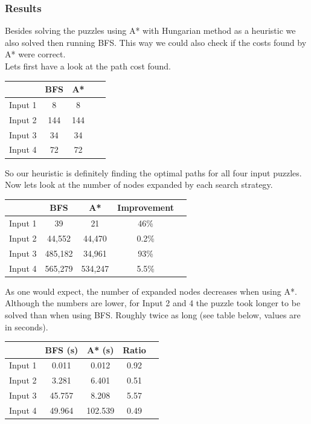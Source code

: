 \documentclass[11pt]{article}
\begin{document}
\subsubsection*{Results}

Besides solving the puzzles using A* with Hungarian method as a heuristic we also solved then running BFS. This way we could also check if the costs found by A* were correct.\\

Lets first have a look at the path cost found.
\begin{center}
\begin{tabular}{l*{3}{c}r}
              & BFS & A* \\
\hline
Input 1       & 8 &    8  \\
Input 2      &   144 & 144 \\
Input 3      &   34 & 34 \\
Input 4      &   72 & 72 \\
\bottomrule
\end{tabular}
\end{center}
So our heuristic is definitely finding the optimal paths for all four input puzzles. Now lets look at the number of nodes expanded by each search strategy.\\

\begin{center}
\begin{tabular}{l*{3}{c}r}
              & BFS & A* & Improvement\\
\hline
Input 1       & 39 &    21 & 46\%  \\
Input 2      &   44,552 & 44,470 & 0.2\% \\
Input 3      &   485,182 & 34,961 & 93\% \\
Input 4      &   565,279 & 534,247 & 5.5\% \\
\bottomrule
\end{tabular}
\end{center}

As one would expect, the number of expanded nodes decreases when using A*. Although the numbers are lower, for Input 2 and 4 the puzzle took longer to be solved than when using BFS. Roughly twice as long (see table below, values are in seconds). 

\begin{center}
\begin{tabular}{l*{3}{c}r}
              & BFS (s) & A* (s) & Ratio\\
\hline
Input 1       & 0.011 &    0.012 & 0.92  \\
Input 2      &   3.281 & 6.401 & 0.51 \\
Input 3      &   45.757 & 8.208 & 5.57 \\
Input 4      &   49.964 & 102.539 & 0.49 \\
\bottomrule
\end{tabular}
\end{center}
\end{document}
